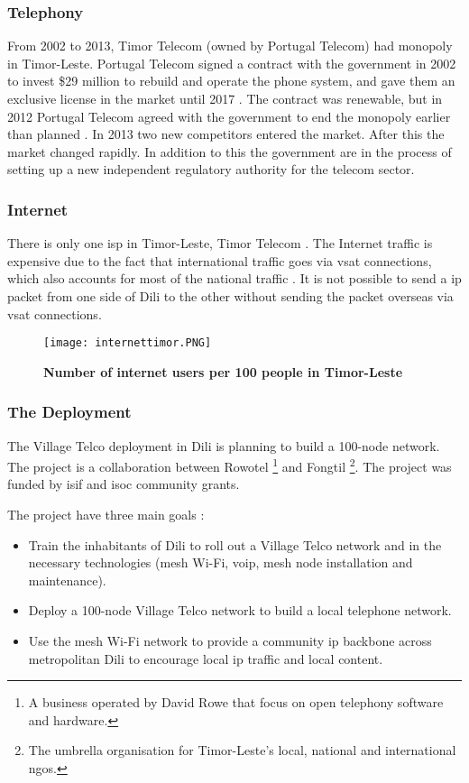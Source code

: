 \subsubsection{Telephony}
From 2002 to 2013, Timor Telecom (owned by Portugal Telecom) had monopoly in Timor-Leste. Portugal Telecom signed a contract with the government in 2002 to invest \$29 million to rebuild and operate the phone system, and gave them an exclusive license in the market until 2017 \cite{wikitelecomeasttimor}. The contract was renewable, but in 2012 Portugal Telecom agreed with the government to end the monopoly earlier than planned \cite{budde}. In 2013 two new competitors entered the market. After this the market changed rapidly. In addition to this the government are in the process of setting up a new independent regulatory authority for the telecom sector. 

\subsubsection{Internet} There is only one \gls{isp} in Timor-Leste, Timor Telecom \cite{wikitelecomeasttimor}. The Internet traffic is expensive due to the fact that international traffic goes via \gls{vsat} connections, which also accounts for most of the national traffic \cite{vtdili}. It is not possible to send a \gls{ip} packet from one side of Dili to the other without sending the packet overseas via \gls{vsat} connections. 


\begin{figure}[t]
\centering
\texttt{[image: internettimor.PNG]}
\caption[Number of internet users per 100 people in Timor-Leste]{\textbf{Number of internet users per 100 people in Timor-Leste}}
\label{fig:internettimor}
\end{figure}

\subsubsection{The Deployment}
The Village Telco deployment in Dili is planning to build a 100-node network. The project is a collaboration between Rowotel \footnote{A business operated by David Rowe that focus on open telephony software and hardware.} and Fongtil \footnote{The umbrella organisation for Timor-Leste’s local, national and international \glspl{ngo}.}. The project was funded by \gls{isif} and \gls{isoc} community grants. 

The project have three main goals \cite{vtdili}:
\begin{itemize}
\item Train the inhabitants of Dili to roll out a Village Telco network and in the necessary technologies (mesh Wi-Fi, \gls{voip}, mesh node installation and maintenance).
\item Deploy a 100-node Village Telco network to build a local telephone network.
\item Use the mesh Wi-Fi network to provide a community \gls{ip} backbone across metropolitan Dili to encourage local \gls{ip} traffic and local content.
\end{itemize}


